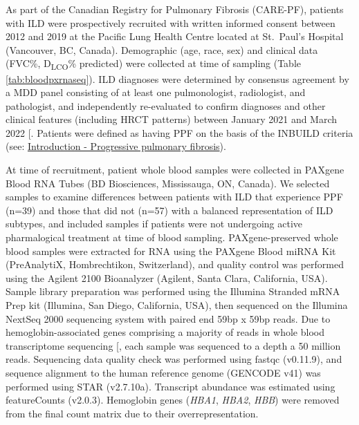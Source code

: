 \documentclass[
]{article}
\begin{document}
As part of the Canadian Registry for Pulmonary Fibrosis (CARE-PF), patients with ILD were prospectively recruited with written informed consent between 2012 and 2019 at the Pacific Lung Health Centre located at St.~Paul's Hospital (Vancouver, BC, Canada). Demographic (age, race, sex) and clinical data (FVC\%, D\textsubscript{LCO}\% predicted) were collected at time of sampling (Table \ref{tab:bloodpxrnaseq}). ILD diagnoses were determined by consensus agreement by a MDD panel consisting of at least one pulmonologist, radiologist, and pathologist, and independently re-evaluated to confirm diagnoses and other clinical features (including HRCT patterns) between January 2021 and March 2022 {[}\citeproc{ref-marinescu_integration_2023}{121}{]}. Patients were defined as having PPF on the basis of the INBUILD criteria (see: \hyperref[ppf]{Introduction - Progressive pulmonary fibrosis}).

At time of recruitment, patient whole blood samples were collected in PAXgene Blood RNA Tubes (BD Biosciences, Mississauga, ON, Canada). We selected samples to examine differences between patients with ILD that experience PPF (n=39) and those that did not (n=57) with a balanced representation of ILD subtypes, and included samples if patients were not undergoing active pharmalogical treatment at time of blood sampling. PAXgene-preserved whole blood samples were extracted for RNA using the PAXgene Blood miRNA Kit (PreAnalytiX, Hombrechtikon, Switzerland), and quality control was performed using the Agilent 2100 Bioanalyzer (Agilent, Santa Clara, California, USA). Sample library preparation was performed using the Illumina Stranded mRNA Prep kit (Illumina, San Diego, California, USA), then sequenced on the Illumina NextSeq 2000 sequencing system with paired end 59bp x 59bp reads. Due to hemoglobin-associated genes comprising a majority of reads in whole blood transcriptome sequencing {[}\citeproc{ref-shin_variation_2014}{122}{]}, each sample was sequenced to a depth a 50 million reads. Sequencing data quality check was performed using fastqc (v0.11.9), and sequence alignment to the human reference genome (GENCODE v41) was performed using STAR (v2.7.10a). Transcript abundance was estimated using featureCounts (v2.0.3). Hemoglobin genes (\textit{HBA1}, \textit{HBA2}, \textit{HBB}) were removed from the final count matrix due to their overrepresentation.
\end{document}
